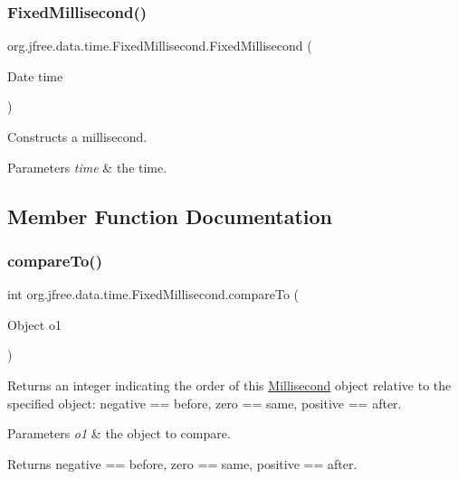 \subsubsection{\texorpdfstring{Fixed\+Millisecond()}{FixedMillisecond()}\hspace{0.1cm}{\footnotesize\ttfamily [3/3]}}
{\footnotesize\ttfamily org.\+jfree.\+data.\+time.\+Fixed\+Millisecond.\+Fixed\+Millisecond (\begin{DoxyParamCaption}\item[{Date}]{time }\end{DoxyParamCaption})}

Constructs a millisecond.


\begin{DoxyParams}{Parameters}
{\em time} & the time. \\
\hline
\end{DoxyParams}


\subsection{Member Function Documentation}
\mbox{\label{classorg_1_1jfree_1_1data_1_1time_1_1_fixed_millisecond_a8f2ab182b9d754aee851e4cf9616e6d0}} 
\subsubsection{\texorpdfstring{compare\+To()}{compareTo()}}
{\footnotesize\ttfamily int org.\+jfree.\+data.\+time.\+Fixed\+Millisecond.\+compare\+To (\begin{DoxyParamCaption}\item[{Object}]{o1 }\end{DoxyParamCaption})}

Returns an integer indicating the order of this \mbox{\hyperlink{classorg_1_1jfree_1_1data_1_1time_1_1_millisecond}{Millisecond}} object relative to the specified object\+: negative == before, zero == same, positive == after.


\begin{DoxyParams}{Parameters}
{\em o1} & the object to compare.\\
\hline
\end{DoxyParams}
\begin{DoxyReturn}{Returns}
negative == before, zero == same, positive == after. 
\end{DoxyReturn}
\mbox{\label{classorg_1_1jfree_1_1data_1_1time_1_1_fixed_millisecond_a9573618685317b1a084ff79c0a44d627}} 
